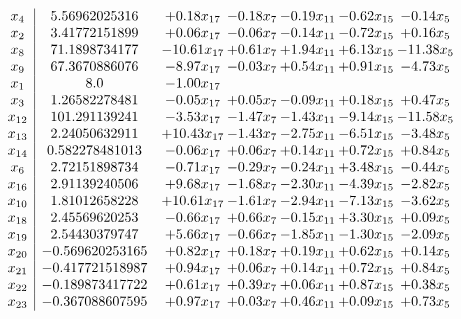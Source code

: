 \documentclass[8pt]{article}
\begin{document}
\[\begin{array}{c| c c@{\hskip 2pt} c@{\hskip 2pt} c@{\hskip 2pt} c@{\hskip 2pt} c@{\hskip 2pt} }
 x_{4}   &  5.56962025316 & +  0.18 x_{17} & -0.18 x_{7} & -0.19 x_{11} & -0.62 x_{15} & -0.14 x_{5}\\
 x_{2}   &  3.41772151899 & +  0.06 x_{17} & -0.06 x_{7} & -0.14 x_{11} & -0.72 x_{15} & +  0.16 x_{5}\\
 x_{8}   &  71.1898734177 & -10.61 x_{17} & +  0.61 x_{7} & +  1.94 x_{11} & +  6.13 x_{15} & -11.38 x_{5}\\
 x_{9}   &  67.3670886076 & -8.97 x_{17} & -0.03 x_{7} & +  0.54 x_{11} & +  0.91 x_{15} & -4.73 x_{5}\\
 x_{1}   &  8.0 & -1.00 x_{17} &    &    &    &   \\
 x_{3}   &  1.26582278481 & -0.05 x_{17} & +  0.05 x_{7} & -0.09 x_{11} & +  0.18 x_{15} & +  0.47 x_{5}\\
 x_{12}   &  101.291139241 & -3.53 x_{17} & -1.47 x_{7} & -1.43 x_{11} & -9.14 x_{15} & -11.58 x_{5}\\
 x_{13}   &  2.24050632911 & + 10.43 x_{17} & -1.43 x_{7} & -2.75 x_{11} & -6.51 x_{15} & -3.48 x_{5}\\
 x_{14}   &  0.582278481013 & -0.06 x_{17} & +  0.06 x_{7} & +  0.14 x_{11} & +  0.72 x_{15} & +  0.84 x_{5}\\
 x_{6}   &  2.72151898734 & -0.71 x_{17} & -0.29 x_{7} & -0.24 x_{11} & +  3.48 x_{15} & -0.44 x_{5}\\
 x_{16}   &  2.91139240506 & +  9.68 x_{17} & -1.68 x_{7} & -2.30 x_{11} & -4.39 x_{15} & -2.82 x_{5}\\
 x_{10}   &  1.81012658228 & + 10.61 x_{17} & -1.61 x_{7} & -2.94 x_{11} & -7.13 x_{15} & -3.62 x_{5}\\
 x_{18}   &  2.45569620253 & -0.66 x_{17} & +  0.66 x_{7} & -0.15 x_{11} & +  3.30 x_{15} & +  0.09 x_{5}\\
 x_{19}   &  2.54430379747 & +  5.66 x_{17} & -0.66 x_{7} & -1.85 x_{11} & -1.30 x_{15} & -2.09 x_{5}\\
 x_{20}   &  -0.569620253165 & +  0.82 x_{17} & +  0.18 x_{7} & +  0.19 x_{11} & +  0.62 x_{15} & +  0.14 x_{5}\\
 x_{21}   &  -0.417721518987 & +  0.94 x_{17} & +  0.06 x_{7} & +  0.14 x_{11} & +  0.72 x_{15} & +  0.84 x_{5}\\
 x_{22}   &  -0.189873417722 & +  0.61 x_{17} & +  0.39 x_{7} & +  0.06 x_{11} & +  0.87 x_{15} & +  0.38 x_{5}\\
 x_{23}   &  -0.367088607595 & +  0.97 x_{17} & +  0.03 x_{7} & +  0.46 x_{11} & +  0.09 x_{15} & +  0.73 x_{5}\\

\end{array}\]
\end{document}
